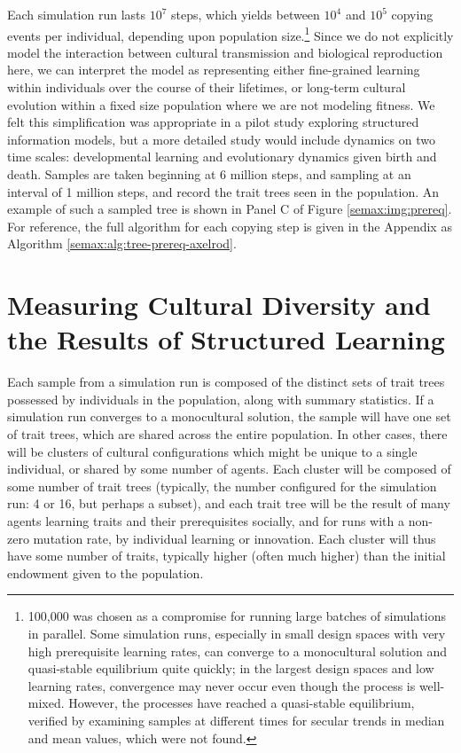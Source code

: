 Each simulation run lasts $10^7$ steps, which yields between $10^4$ and
$10^5$ copying events per individual, depending upon population
size.\footnote{100,000 was chosen as a compromise for running large
  batches of simulations in parallel. Some simulation runs, especially
  in small design spaces with very high prerequisite learning rates, can
  converge to a monocultural solution and quasi-stable equilibrium quite
  quickly; in the largest design spaces and low learning rates,
  convergence may never occur even though the process is well-mixed.
  However, the processes have reached a quasi-stable equilibrium,
  verified by examining samples at different times for secular trends in
  median and mean values, which were not found.} Since we do not
explicitly model the interaction between cultural transmission and
biological reproduction here, we can interpret the model as representing
either fine-grained learning within individuals over the course of their
lifetimes, or long-term cultural evolution within a fixed size
population where we are not modeling fitness. We felt this
simplification was appropriate in a pilot study exploring structured
information models, but a more detailed study would include dynamics on
two time scales: developmental learning and evolutionary dynamics given
birth and death. Samples are taken beginning at 6 million steps, and
sampling at an interval of 1 million steps, and record the trait trees
seen in the population. An example of such a sampled tree is shown in
Panel C of Figure \ref{semax:img:prereq}. For reference, the full algorithm
for each copying step is given in the Appendix as Algorithm
\ref{semax:alg:tree-prereq-axelrod}.
\section{Measuring Cultural Diversity and the Results of Structured
Learning}\label{semax:sec:measuring-cultural-diversity-and-the-results-of-structured-learning}

Each sample from a simulation run is composed of the distinct sets of
trait trees possessed by individuals in the population, along with
summary statistics. If a simulation run converges to a monocultural
solution, the sample will have one set of trait trees, which are shared
across the entire population. In other cases, there will be clusters of
cultural configurations which might be unique to a single individual, or
shared by some number of agents. Each cluster will be composed of some
number of trait trees (typically, the number configured for the
simulation run: 4 or 16, but perhaps a subset), and each trait tree will
be the result of many agents learning traits and their prerequisites
socially, and for runs with a non-zero mutation rate, by individual
learning or innovation. Each cluster will thus have some number of
traits, typically higher (often much higher) than the initial endowment
given to the population.

